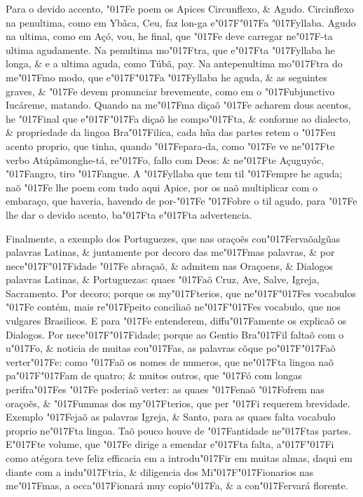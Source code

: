 \documentclass[openany,titlepage,12pt]{book}
\newcommand{\lgS}{\char"017F}
\newcommand{\lgSS}{\char"017F\char"017F}
\begin{document}
Para o devido accento, \lgS e poem os Apices Circunflexo, \& Agudo.
Circinflexo na penultima, como em Ybâca, Ceu, 
faz lon-ga e\lgSS a \lgS yllaba.
Agudo na ultima, como em Açó, vou, he final, que \lgS e deve
carregar ne\lgS -ta ultima agudamente. Na penultima mo\lgS tra, que
e\lgS ta \lgS yllaba he longa, \& e a ultima aguda, como Túbã, pay.
Na antepenultima mo\lgS tra do me\lgS mo modo, que e\lgSS a 
\lgS yllaba he aguda, \& as seguintes graves, \& \lgS e devem
pronunciar brevemente, como em o \lgS ubjunctivo Iucáreme, matando.
Quando na me\lgS ma diçaõ \lgS e acharem dous acentos, he \lgS inal
que e\lgSS a diçaõ he compo\lgS ta, \& conforme ao dialecto, \&
propriedade da lingoa Bra\lgS ilica, cada hũa das partes retem o 
\lgS eu acento proprio, que tinha, quando \lgS epara-da, como 
\lgS e ve ne\lgS te verbo Atúpãmonghe-tá, re\lgS o,
fallo com Deos: \& ne\lgS te Açuguyóc, \lgS angro,
tiro \lgS angue. A \lgS yllaba 
que tem til \lgS empre he aguda; naõ \lgS e lhe poem com tudo
aqui Apice, por os naõ multiplicar com o embaraço, que haveria,
havendo de por-\lgS e \lgS obre o til agudo, para 
\lgS e lhe dar o devido acento, ba\lgS ta
e\lgS ta advertencia.

Finalmente, a exemplo dos Portuguezes, 
que nas oraçoẽs con\lgS ervaõalgũas palavras Latinas, 
\& juntamente por decoro das me\lgS mas palavras, 
\& por nece\lgSS idade \lgS e abraçaõ, \& admitem nas
Oraçoens, \& Dialogos palavras Latinas, \& Portuguezas: quaes 
\lgS aõ Cruz, Ave, Salve, Igreja, Sacramento. Por decoro; porque
os my\lgS terios, que ne\lgSS es vocabulos \lgS e contém, mais
re\lgS peito conciliaõ ne\lgSS es vocabulo, que nos vulgares
Brasilicos. E para \lgS e entenderem, diffu\lgS amente os explicaõ
os Dialogos. Por nece\lgSS idade; porque ao Gentio Bra\lgS il faltaõ
com o u\lgS o, \& noticia de muitas cou\lgS as, as palavras cõque
po\lgSS aõ verter\lgS e: como \lgS aõ os nomes de numeros, que
ne\lgS ta lingoa naõ pa\lgSS am de quatro; \& muitos outros, que
\lgS ó com longas perifra\lgS es \lgS e poderiaõ verter: as quaes 
\lgS enaõ \lgS ofrem nas oraçoẽs, \& \lgS ummas dos my\lgS terios,
que per \lgS i requerem brevidade. Exemplo \lgS ejaõ as palavras
Igreja, \& Santo, para as quaes falta vocabulo proprio ne\lgS ta
lingoa. Taõ pouco houve de \lgS antidade ne\lgS tas partes.
E\lgS te volume, que \lgS e dirige a emendar e\lgS ta falta,
a\lgSS i como atégora teve feliz efficacia em a introdu\lgS ir em
muitas almas, daqui em diante com a indu\lgS tria, \&
diligencia dos Mi\lgSS ionarios nas me\lgS mas, a occa\lgS ionará
muy copio\lgS a, \& a con\lgS ervará florente.
\newpage
\end{document}
